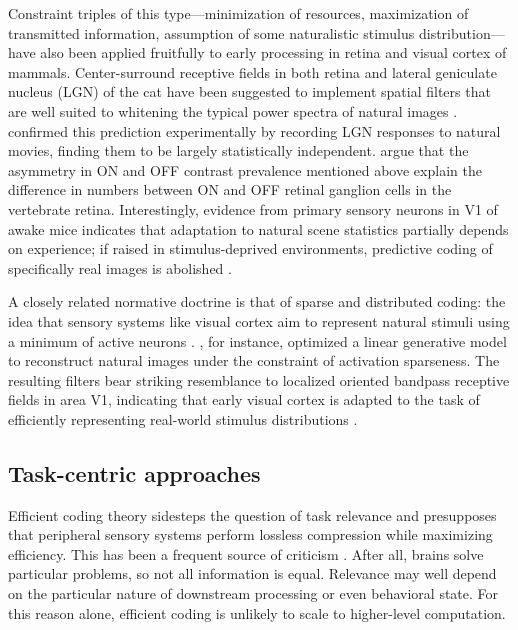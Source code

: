 Constraint triples of this type---minimization of resources, maximization of transmitted information, assumption of some naturalistic stimulus distribution---have also been applied fruitfully to early processing in retina and visual cortex of mammals. Center-surround receptive fields in both retina and lateral geniculate nucleus (LGN) of the cat have been suggested to implement spatial filters that are well suited to whitening the typical power spectra of natural images \citep{vanHateren:1992aa,Atick:1992aa,vanHateren:1993aa}. \citet{Dan:1996aa} confirmed this prediction experimentally by recording LGN responses to natural movies, finding them to be largely statistically independent. \citet{Ratliff:2010kb} argue that the asymmetry in ON and OFF contrast prevalence mentioned above explain the difference in numbers between ON and OFF retinal ganglion cells in the vertebrate retina. Interestingly, evidence from primary sensory neurons in V1 of awake mice indicates that adaptation to natural scene statistics partially depends on experience; if raised in stimulus-deprived environments, predictive coding of specifically real images is abolished \citep{Pecka:2014aa}.

A closely related normative doctrine is that of sparse and distributed coding: the idea that sensory systems like visual cortex aim to represent natural stimuli using a minimum of active neurons \citep{Simoncelli:2001dn}. \citet{Ohlshausen:1996aa}, for instance, optimized a linear generative model to reconstruct natural images under the constraint of activation sparseness. The resulting filters bear striking resemblance to localized oriented bandpass receptive fields in area V1, indicating that early visual cortex is adapted to the task of efficiently representing real-world stimulus distributions \citep[for a related method, based on independent component analysis, see][]{vanHateren:1998jt,Bell:1997ve}.

\subsection{Task-centric approaches}
Efficient coding theory sidesteps the question of task relevance and presupposes that peripheral sensory systems perform lossless compression while maximizing efficiency. This has been a frequent source of criticism \citep{Simoncelli:2003aa}. After all, brains solve particular problems, so not all information is equal. Relevance may well depend on the particular nature of downstream processing or even behavioral state. For this reason alone, efficient coding is unlikely to scale to higher-level computation.

